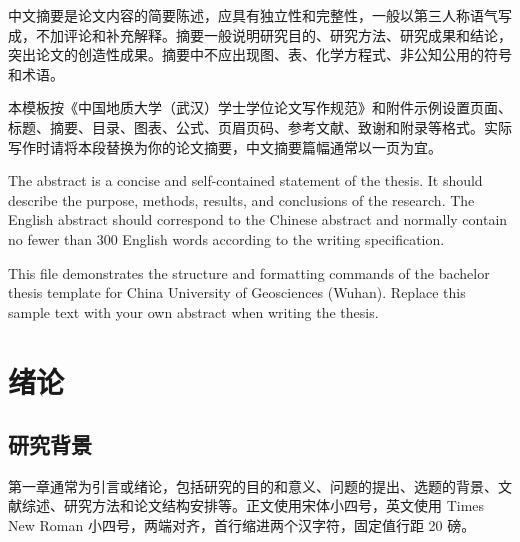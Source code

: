 \documentclass{cugthesis}
\begin{document}
\makeCUGcover
\makeCUGoriginality

\CUGfrontmatter

\begin{CUGabstract}
中文摘要是论文内容的简要陈述，应具有独立性和完整性，一般以第三人称语气写成，不加评论和补充解释。摘要一般说明研究目的、研究方法、研究成果和结论，突出论文的创造性成果。摘要中不应出现图、表、化学方程式、非公知公用的符号和术语。

本模板按《中国地质大学（武汉）学士学位论文写作规范》和附件示例设置页面、标题、摘要、目录、图表、公式、页眉页码、参考文献、致谢和附录等格式。实际写作时请将本段替换为你的论文摘要，中文摘要篇幅通常以一页为宜。

\end{CUGabstract}

\begin{CUGabstractEN}
The abstract is a concise and self-contained statement of the thesis. It should describe the purpose, methods, results, and conclusions of the research. The English abstract should correspond to the Chinese abstract and normally contain no fewer than 300 English words according to the writing specification.

This file demonstrates the structure and formatting commands of the bachelor thesis template for China University of Geosciences (Wuhan). Replace this sample text with your own abstract when writing the thesis.

\end{CUGabstractEN}

\makeCUGtoc

\makeCUGlof
\makeCUGlot

\CUGmainmatter

\chapter{绪论}

\section{研究背景}

第一章通常为引言或绪论，包括研究的目的和意义、问题的提出、选题的背景、文献综述、研究方法和论文结构安排等。正文使用宋体小四号，英文使用 Times New Roman 小四号，两端对齐，首行缩进两个汉字符，固定值行距 20 磅。
\end{document}
